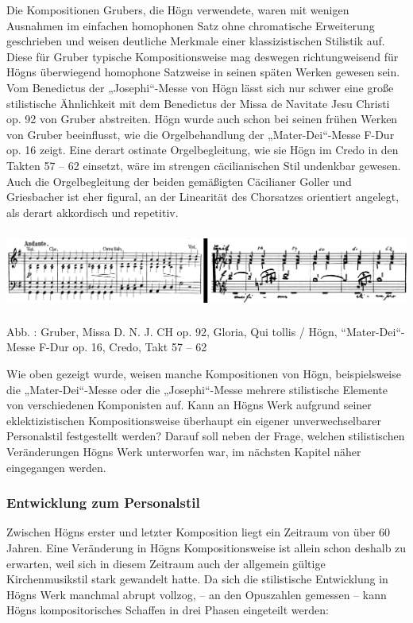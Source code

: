 \documentclass[a4paper]{article}
\newcounter{Abb}
\renewcommand\theAbb{\arabic{Abb}}
\begin{document}
Die Kompositionen Grubers, die Högn verwendete, waren mit wenigen
Ausnahmen im einfachen homophonen Satz ohne chromatische Erweiterung
geschrieben und weisen deutliche Merkmale einer klassizistischen
Stilistik auf. Diese für Gruber typische Kompositionsweise mag deswegen
richtungweisend für Högns überwiegend homophone Satzweise in seinen
späten Werken gewesen sein. Vom Benedictus der „Josephi“-Messe von Högn
lässt sich nur schwer eine große stilistische Ähnlichkeit mit dem
Benedictus der Missa de Navitate Jesu Christi op. 92 von Gruber
abstreiten. Högn wurde auch schon bei seinen frühen Werken von Gruber
beeinflusst, wie die Orgelbehandlung der „Mater-Dei“-Messe F-Dur op. 16
zeigt. Eine derart ostinate Orgelbegleitung, wie sie Högn im Credo in
den Takten 57 – 62 einsetzt, wäre im strengen cäcilianischen Stil
undenkbar gewesen. Auch die Orgelbegleitung der beiden gemäßigten
Cäcilianer Goller und Griesbacher ist eher figural, an der Linearität
des Chorsatzes orientiert angelegt, als derart akkordisch und
repetitiv.


\includegraphics[width=15.977cm,height=2.589cm]{pictures/zulassungsarbeit-img094.png}


Abb. \stepcounter{Abb}{\theAbb}: Gruber, Missa D. N. J. CH op. 92,
Gloria, Qui tollis / Högn, “Mater-Dei“-Messe F-Dur op. 16, Credo, Takt
57 – 62

Wie oben gezeigt wurde, weisen manche Kompositionen von Högn,
beispielsweise die „Mater-Dei“-Messe oder die „Josephi“-Messe mehrere
stilistische Elemente von verschiedenen Komponisten auf. Kann an Högns
Werk aufgrund seiner eklektizistischen Kompositionsweise überhaupt ein
eigener unverwechselbarer Personalstil festgestellt werden? Darauf soll
neben der Frage, welchen stilistischen Veränderungen Högns Werk
unterworfen war, im nächsten Kapitel näher eingegangen werden.













\subsubsection{Entwicklung zum Personalstil}
\hypertarget{RefHeadingToc100333751}{}Zwischen Högns erster und letzter
Komposition liegt ein Zeitraum von über 60 Jahren. Eine Veränderung in
Högns Kompositionsweise ist allein schon deshalb zu erwarten, weil sich
in diesem Zeitraum auch der allgemein gültige Kirchenmusikstil stark
gewandelt hatte. Da sich die stilistische Entwicklung in Högns Werk
manchmal abrupt vollzog, – an den Opuszahlen gemessen – kann Högns
kompositorisches Schaffen in drei Phasen eingeteilt werden:
\end{document}
